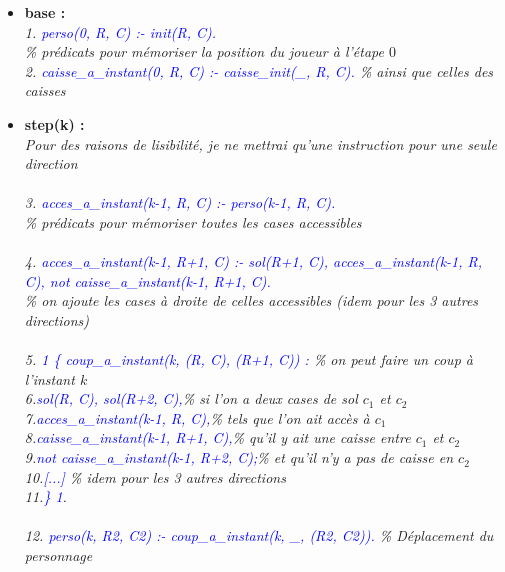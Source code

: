 \documentclass[12pt,a4paper]{article}
\begin{document}
\begin{itemize}
	\item \textbf{base :}\\
	\emph{
		1. \textcolor{blue}{perso(0, R, C) :- init(R, C).}\\
		\% prédicats pour mémoriser la position du joueur à l'étape $0$\\
		2. \textcolor{blue}{caisse\_a\_instant(0, R, C) :- caisse\_init(\_, R, C).} \% ainsi que celles des caisses\\
	}
	\item \textbf{step(k) :}\\
	\emph{Pour des raisons de lisibilité, je ne mettrai qu'une instruction pour une seule direction}\\ \\
	\emph{
		3. \textcolor{blue}{acces\_a\_instant(k-1, R, C) :- perso(k-1, R, C).}\\
		\% prédicats pour mémoriser toutes les cases accessibles\\ \\
		4. \textcolor{blue}{acces\_a\_instant(k-1, R+1, C) :- sol(R+1, C), acces\_a\_instant(k-1, R, C), not caisse\_a\_instant(k-1, R+1, C).}\\
		\% on ajoute les cases à droite de celles accessibles (idem pour les 3 autres directions)\\ \\
		5. \textcolor{blue}{1 \{ coup\_a\_instant(k, (R, C), (R+1, C)) :} \% on peut faire un coup à l'instant $k$\\
		6.\qquad\qquad\textcolor{blue}{sol(R, C), sol(R+2, C),}\% si l'on a deux cases de sol $c_1$ et $c_2$\\
		7.\qquad\qquad\textcolor{blue}{acces\_a\_instant(k-1, R, C),}\% tels que l'on ait accès à $c_1$\\
		8.\qquad\qquad\textcolor{blue}{caisse\_a\_instant(k-1, R+1, C),}\% qu'il y ait une caisse entre $c_1$ et $c_2$\\
		9.\qquad\qquad\textcolor{blue}{not caisse\_a\_instant(k-1, R+2, C);}\% et qu'il n'y a pas de caisse en $c_2$\\
		10.\qquad\qquad\textcolor{blue}{[...]} \% idem pour les 3 autres directions\\
		11.\qquad\qquad \textcolor{blue}{\} 1}.\\ \\
		12. \textcolor{blue}{perso(k, R2, C2) :- coup\_a\_instant(k, \_, (R2, C2)).} \% Déplacement du personnage\\ \\
}
\end{itemize}
\end{document}
